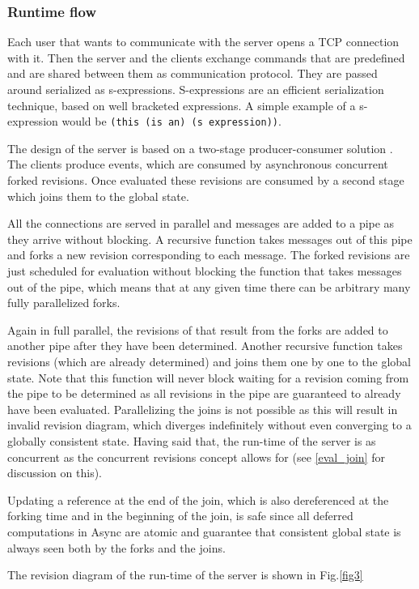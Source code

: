 \documentclass[12pt,twoside,notitlepage]{report}
\begin{document}
{\subsubsection{Runtime flow}
Each user that wants to communicate with the server opens a TCP connection with it. Then the server and the clients exchange commands that are predefined and are shared between them as communication protocol. They are passed around serialized as s-expressions. S-expressions are an efficient serialization technique, based on well bracketed expressions. A simple example of a s-expression would be {\tt (this (is an) (s expression))}. 

The design of the server is based on a two-stage producer-consumer solution \cite{bacon}. The clients produce events, which are consumed by asynchronous concurrent forked revisions. Once evaluated these revisions are consumed by a second stage which joins them to the global state. 

All the connections are served in parallel and messages are added to a pipe as they arrive without blocking. A recursive function takes messages out of this pipe and forks a new revision corresponding to each message. The forked revisions are just scheduled for evaluation without blocking the function that takes messages out of the pipe, which means that at any given time there can be arbitrary many fully parallelized forks. 

Again in full parallel, the revisions of that result from the forks are added to another pipe after they have been determined. Another recursive function takes revisions (which are already determined) and joins them one by one to the global state. Note that this function will never block waiting for a revision coming from the pipe to be determined as all revisions in the pipe are guaranteed to already have been evaluated. Parallelizing the joins is not possible as this will result in invalid revision diagram, which diverges indefinitely without even converging to a globally consistent state. Having said that, the run-time of the server is as concurrent as the concurrent revisions concept allows for (see \ref{eval_join} for discussion on this).

Updating a reference at the end of the join, which is also dereferenced at the forking time and in the beginning of the join, is safe since all deferred computations in Async are atomic and guarantee that consistent global state is always seen both by the forks and the joins. 

The revision diagram of the run-time of the server is shown in Fig.\ref{fig3}

}
\end{document}
